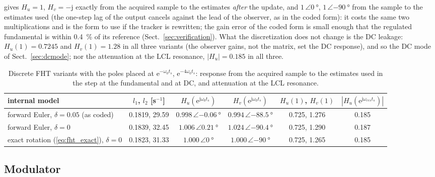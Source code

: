 \documentclass[10pt,a4paper]{scrartcl}
\newcommand{\ts}{t_s}
\newcommand{\wo}{\omega_0}
\newcommand{\wres}{\omega_{res}}
\newcommand{\jj}{\mathrm{j}}
\newcommand{\ee}{\mathrm{e}}
\newcommand{\Hu}{H_u}
\newcommand{\Hv}{H_v}
\begin{document}
\begin{onehalfspace}
\begin{equation}
\label{eq:fht_exact}
\end{equation}
gives $\Hu = 1$, $\Hv = -\jj$ exactly from the acquired sample to the estimates \emph{after} the update, and $1\,\angle\SI{0}{\degree}$, $1\,\angle\SI{-90}{\degree}$ from the sample to the estimates used (the one-step lag of the output cancels against the lead of the observer, as in the coded form): it costs the same two multiplications and is the form to use if the tracker is rewritten; the gain error of the coded form is small enough that the regulated fundamental is within \SI{0.4}{\percent} of its reference (Sect.~\ref{sec:verification}). What the discretization does not change is the DC leakage: $\Hu(1) = 0.7245$ and $\Hv(1) = 1.28$ in all three variants (the observer gains, not the matrix, set the DC response), and so the DC mode of Sect.~\ref{sec:dcmode}; nor the attenuation at the LCL resonance, $|\Hu| = 0.185$ in all three.

\begin{table}[htb]
\centering\small
\caption{Discrete FHT variants with the poles placed at $\ee^{-\wo\ts}$, $\ee^{-4\wo\ts}$: response from the acquired sample to the estimates used in the step at the fundamental and at DC, and attenuation at the LCL resonance.}
\label{tab:fhtvar}
\begin{tabular}{@{}lccccc@{}}
\toprule
internal model & $l_1$, $l_2$ [s$^{-1}$] & $\Hu(\ee^{\jj\wo\ts})$ & $\Hv(\ee^{\jj\wo\ts})$ & $\Hu(1)$, $\Hv(1)$ & $|\Hu(\ee^{\jj\wres\ts})|$ \\
\midrule
forward Euler, $\delta = 0.05$ (as coded) & 0.1819, 29.59 & $0.998\,\angle\SI{-0.06}{\degree}$ & $0.994\,\angle\SI{-88.5}{\degree}$ & 0.725, 1.276 & 0.185 \\
forward Euler, $\delta = 0$ & 0.1839, 32.45 & $1.006\,\angle\SI{+0.21}{\degree}$ & $1.024\,\angle\SI{-90.4}{\degree}$ & 0.725, 1.290 & 0.187 \\
exact rotation (\ref{eq:fht_exact}), $\delta = 0$ & 0.1823, 31.33 & $1.000\,\angle\SI{0}{\degree}$ & $1.000\,\angle\SI{-90}{\degree}$ & 0.725, 1.265 & 0.185 \\
\bottomrule
\end{tabular}
\end{table}

\subsection{Modulator}
\label{sec:modulator}


\end{onehalfspace}
\end{document}
